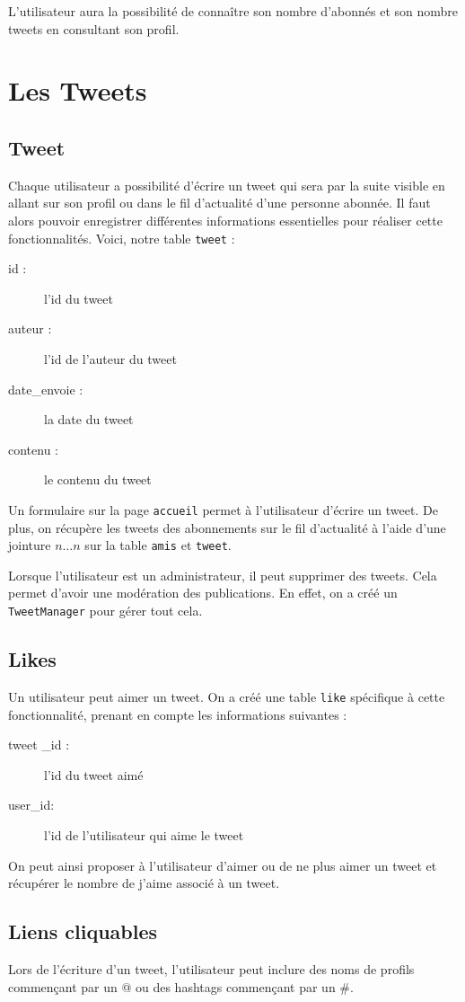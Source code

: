 \documentclass[a4paper, 12pt]{article}
\begin{document}
L'utilisateur aura la possibilité de connaître son nombre d'abonnés et son nombre tweets en consultant son profil.

\section{Les Tweets}	

\subsection{Tweet}
Chaque utilisateur a possibilité d'écrire un tweet qui sera par la suite visible en allant sur son profil ou dans le fil d'actualité d'une personne abonnée. Il faut alors pouvoir enregistrer différentes informations essentielles pour réaliser cette fonctionnalités. Voici, notre table \texttt{tweet} :
\begin{description}
\item[id :] l'id du tweet
\item[auteur :] l’id de l’auteur du tweet
\item[date\_envoie :] la date du tweet
\item[contenu :] le contenu du tweet
\end{description}
Un formulaire sur la page \texttt{accueil} permet à l’utilisateur d’écrire un tweet.
De plus, on récupère les tweets des abonnements sur le fil d’actualité à l’aide d'une  jointure $n…n$ sur la table \texttt{amis} et \texttt{tweet}.

Lorsque l'utilisateur est un administrateur, il peut supprimer des tweets. Cela permet d'avoir une modération des publications. En effet, on a créé un \texttt{TweetManager} pour gérer tout cela.

\subsection{Likes}
Un utilisateur peut aimer un tweet. On a créé une table \texttt{like} spécifique à cette fonctionnalité, prenant en compte les informations suivantes :
\begin{description}
\item[tweet \_id :] l’id du tweet aimé
\item[user\_id:] l'id de l'utilisateur qui aime le tweet
\end{description}
On peut ainsi proposer à l'utilisateur d'aimer ou de ne plus aimer un tweet et récupérer le nombre de j'aime associé à un tweet.

\subsection{Liens cliquables}		
Lors de l'écriture d'un tweet, l'utilisateur peut inclure des noms de profils commençant par un @ ou des hashtags commençant par un \#. 
\end{document}
